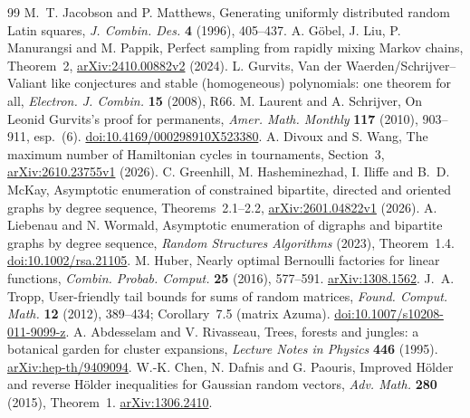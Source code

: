 \begin{thebibliography}{99}
M.~T. Jacobson and P. Matthews,
Generating uniformly distributed random Latin squares,
\emph{J. Combin. Des.} \textbf{4} (1996), 405--437.
A. G\"obel, J. Liu, P. Manurangsi and M. Pappik,
Perfect sampling from rapidly mixing Markov chains, Theorem~2,
\href{https://arxiv.org/abs/2410.00882v2}{arXiv:2410.00882v2} (2024).
L. Gurvits, Van der Waerden/Schrijver--Valiant like conjectures and stable
(homogeneous) polynomials: one theorem for all,
\emph{Electron. J. Combin.} \textbf{15} (2008), R66.
M. Laurent and A. Schrijver, On Leonid Gurvits's proof for permanents,
\emph{Amer. Math. Monthly} \textbf{117} (2010), 903--911, esp.\ (6).
\href{https://doi.org/10.4169/000298910X523380}{doi:10.4169/000298910X523380}.
A. Divoux and S. Wang, The maximum number of Hamiltonian cycles in
tournaments, Section~3, \href{https://arxiv.org/abs/2610.23755v1}{arXiv:2610.23755v1} (2026).
C. Greenhill, M. Hasheminezhad, I. Iliffe and B.~D. McKay,
Asymptotic enumeration of constrained bipartite, directed and oriented graphs
by degree sequence, Theorems~2.1--2.2,
\href{https://arxiv.org/abs/2601.04822v1}{arXiv:2601.04822v1} (2026).
A. Liebenau and N. Wormald, Asymptotic enumeration of digraphs and bipartite graphs
by degree sequence, \emph{Random Structures Algorithms} (2023), Theorem~1.4.
\href{https://doi.org/10.1002/rsa.21105}{doi:10.1002/rsa.21105}.
M. Huber, Nearly optimal Bernoulli factories for linear functions,
\emph{Combin. Probab. Comput.} \textbf{25} (2016), 577--591.
\href{https://arxiv.org/abs/1308.1562}{arXiv:1308.1562}.
J.~A. Tropp, User-friendly tail bounds for sums of random matrices,
\emph{Found. Comput. Math.} \textbf{12} (2012), 389--434;
Corollary~7.5 (matrix Azuma).
\href{https://doi.org/10.1007/s10208-011-9099-z}{doi:10.1007/s10208-011-9099-z}.
A. Abdesselam and V. Rivasseau, Trees, forests and jungles: a botanical garden for cluster expansions,
\emph{Lecture Notes in Physics} \textbf{446} (1995).
\href{https://arxiv.org/abs/hep-th/9409094}{arXiv:hep-th/9409094}.
W.-K. Chen, N. Dafnis and G. Paouris, Improved H\"older and reverse H\"older inequalities for Gaussian random vectors,
\emph{Adv. Math.} \textbf{280} (2015), Theorem~1.
\href{https://arxiv.org/abs/1306.2410}{arXiv:1306.2410}.


\end{thebibliography}
